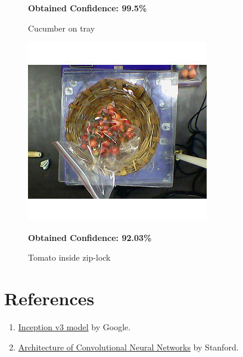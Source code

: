 \documentclass[a4paper,12pt,oneside]{book}
\begin{document}
\begin{itemize}
\begin{figure}[!ht]
	  	\caption{Cucumber on tray}\textbf{ Obtained Confidence: 99.5\%}
	  	\label{fig:cucumber-tray}
	  \end{figure}
  \hfill
	  \begin{figure}[!ht]
	  	\centering
	  	\includegraphics[width=0.5\linewidth]{"tomato - ziplock"}
	  	\caption{Tomato inside zip-lock}\textbf{ Obtained Confidence: 92.03\%}
	  	\label{fig:tomato---ziplock}
	  \end{figure}

	  
\end{itemize}

\clearpage
\section{References}
\begin{enumerate}
	\item \href{https://arxiv.org/abs/1512.00567}{Inception v3 model} by Google.
	\item \href{http://cs231n.github.io/convolutional-networks/}{Architecture of Convolutional Neural Networks} by Stanford.
\end{enumerate}
\end{document}
